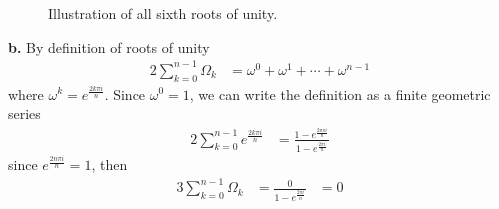 \documentclass[12pt]{article}
\begin{document}
	\begin{figure}[H]
	\def\n{6}
	\centering
	\caption{Illustration of all sixth roots of unity.}
	\end{figure}
	\textbf{b.} By definition of roots of unity
	\begin{alignat*}{2}
		\sum_{k = 0}^{n-1}\Omega_k &= \omega^0 + \omega^1 + \cdots + \omega^{n-1}
	\end{alignat*}
	where $\omega^k = e^{\frac{2 k \pi i}{n}}$. Since $\omega^0 = 1$, we can write the definition as a finite geometric series
	\begin{alignat*}{2}
	\sum_{k = 0}^{n-1} e^{\frac{2 k \pi i}{n}}&= \frac{1 - e^{\frac{2 n \pi i}{n}}}{1 - e^{\frac{2\pi i}{n}}}
	\end{alignat*}
	since $e^{\frac{2 n \pi i}{n}} = 1$, then 
	\begin{alignat*}{3}
	\sum_{k = 0}^{n-1} \Omega_k &= \frac{0}{1 - e^{\frac{2\pi i}{n}}} &= 0
	\end{alignat*}
\end{document}
